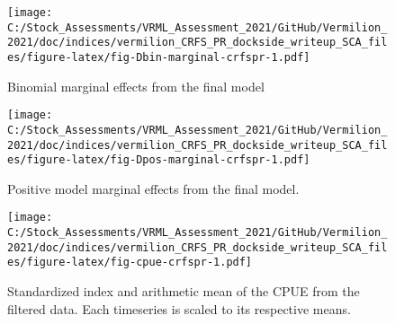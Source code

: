 \documentclass[
]{article}
\begin{document}
\begin{figure}
\centering
\texttt{[image: C:/Stock\_Assessments/VRML\_Assessment\_2021/GitHub/Vermilion\_2021/doc/indices/vermilion\_CRFS\_PR\_dockside\_writeup\_SCA\_files/figure-latex/fig-Dbin-marginal-crfspr-1.pdf]}
\caption{\label{fig:fig-Dbin-marginal-crfspr}Binomial marginal effects from the final model}
\end{figure}

\begin{figure}
\centering
\texttt{[image: C:/Stock\_Assessments/VRML\_Assessment\_2021/GitHub/Vermilion\_2021/doc/indices/vermilion\_CRFS\_PR\_dockside\_writeup\_SCA\_files/figure-latex/fig-Dpos-marginal-crfspr-1.pdf]}
\caption{\label{fig:fig-Dpos-marginal-crfspr}Positive model marginal effects from the final model.}
\end{figure}

\begin{figure}
\centering
\texttt{[image: C:/Stock\_Assessments/VRML\_Assessment\_2021/GitHub/Vermilion\_2021/doc/indices/vermilion\_CRFS\_PR\_dockside\_writeup\_SCA\_files/figure-latex/fig-cpue-crfspr-1.pdf]}
\caption{\label{fig:fig-cpue-crfspr}Standardized index and arithmetic mean of the CPUE from the filtered data. Each timeseries is scaled to its respective means.}
\end{figure}
\end{document}
